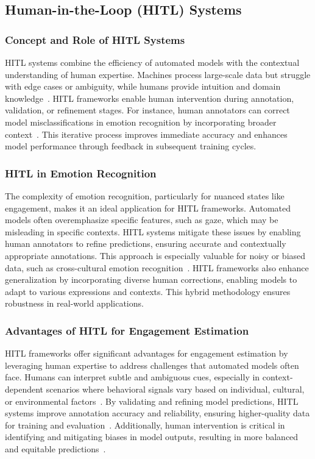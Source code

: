 \subsection{Human-in-the-Loop (HITL) Systems}
\subsubsection{Concept and Role of HITL Systems}
HITL systems combine the efficiency of automated models with the contextual understanding of human expertise. Machines process large-scale data but struggle with edge cases or ambiguity, while humans provide intuition and domain knowledge~\cite{amershi2014power}. HITL frameworks enable human intervention during annotation, validation, or refinement stages. For instance, human annotators can correct model misclassifications in emotion recognition by incorporating broader context~\cite{holstein2019improving}. This iterative process improves immediate accuracy and enhances model performance through feedback in subsequent training cycles.

\subsubsection{HITL in Emotion Recognition}
The complexity of emotion recognition, particularly for nuanced states like engagement, makes it an ideal application for HITL frameworks. Automated models often overemphasize specific features, such as gaze, which may be misleading in specific contexts. HITL systems mitigate these issues by enabling human annotators to refine predictions, ensuring accurate and contextually appropriate annotations. This approach is especially valuable for noisy or biased data, such as cross-cultural emotion recognition~\cite{gong2023cross}. HITL frameworks also enhance generalization by incorporating diverse human corrections, enabling models to adapt to various expressions and contexts. This hybrid methodology ensures robustness in real-world applications.

\subsubsection{Advantages of HITL for Engagement Estimation}
HITL frameworks offer significant advantages for engagement estimation by leveraging human expertise to address challenges that automated models often face. Humans can interpret subtle and ambiguous cues, especially in context-dependent scenarios where behavioral signals vary based on individual, cultural, or environmental factors~\cite{salam2022automatic}. By validating and refining model predictions, HITL systems improve annotation accuracy and reliability, ensuring higher-quality data for training and evaluation~\cite{zhang2023labelvizier}. Additionally, human intervention is critical in identifying and mitigating biases in model outputs, resulting in more balanced and equitable predictions~\cite{lukac2023study}. 

